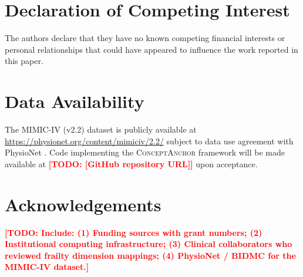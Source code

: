 \documentclass[review,12pt,authoryear]{elsarticle}
\newcommand{\todo}[1]{\textcolor{red}{\textbf{[TODO: #1]}}}
\newcommand{\modelname}{\textsc{ConceptAnchor}}
\newcommand{\dataset}{MIMIC-IV (v2.2)}
\begin{document}
\section*{Declaration of Competing Interest}
The authors declare that they have no known competing financial interests or personal relationships that could have appeared to influence the work reported in this paper.

\section*{Data Availability}
The \dataset{} dataset is publicly available at \url{https://physionet.org/content/mimiciv/2.2/} subject to data use agreement with PhysioNet \citep{johnson2023mimic}.
Code implementing the \modelname{} framework will be made available at \todo{[GitHub repository URL]} upon acceptance.

\section*{Acknowledgements}
\todo{Include: (1) Funding sources with grant numbers; (2) Institutional computing infrastructure; (3) Clinical collaborators who reviewed frailty dimension mappings; (4) PhysioNet / BIDMC for the MIMIC-IV dataset.}


\end{document}
